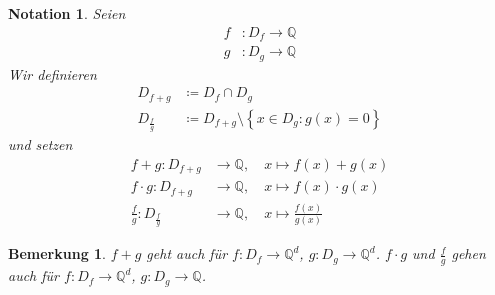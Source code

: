 \documentclass[11pt, twoside, a4paper]{article}
\theoremstyle{plain}
\newtheorem{bemerkung}[blockelement]{Bemerkung}
\newtheorem{notation}[blockelement]{Notation}
\newcommand{\set}[1]{\left\{#1\right\}}
\newcommand{\definedas}[0]{\coloneqq}
\newcommand{\exclude}[0]{\setminus}
\newcommand{\fromto}{\rightarrow{}}
\newcommand{\K}{\mathbb{Q}}
\begin{document}
    \begin{notation}
        Seien
        \begin{align*}
            f&: D_f \fromto \K\\
            g&: D_g \fromto \K
        \end{align*}
        Wir definieren
        \begin{align*}
            D_{f+g} &\definedas D_f \cap D_g\\
            D_{\frac{f}{g}} &\definedas D_{f+g} \exclude\set{x\in D_g: g(x)=0}
        \end{align*}
        und setzen
        \begin{align*}
            f + g: D_{f+g} &\fromto \K,\quad x \mapsto  f(x) + g(x)\\
            f \cdot g: D_{f+g} &\fromto \K,\quad x \mapsto  f(x) \cdot g(x)\\
            \frac{f}{g}: D_{\frac{f}{g}} &\fromto \K,\quad x \mapsto \frac{f(x)}{g(x)}
        \end{align*}
    \end{notation}

    \begin{bemerkung}
        $f+g$ geht auch für $f: D_f \fromto \K^d$, $g: D_g \fromto \K^d$. $f\cdot g$ und $\frac{f}{g}$ gehen auch für $f: D_f \fromto \K^d$, $g: D_g \fromto \K$.
    \end{bemerkung}

    \newpage
\end{document}
